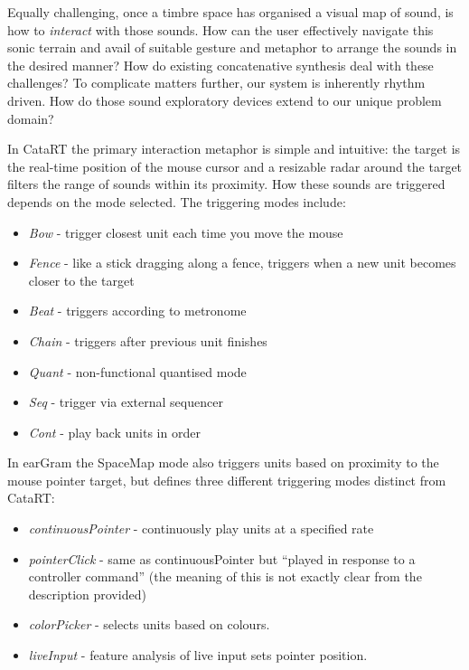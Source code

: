 Equally challenging, once a timbre space has organised a visual map of sound, is how to \textit{interact} with those sounds. How can the user effectively navigate this sonic terrain and avail of suitable gesture and metaphor to arrange the sounds in the desired manner? How do existing concatenative synthesis deal with these challenges? To complicate matters further, our system is inherently rhythm driven. How do those sound exploratory devices extend to our unique problem domain?

In CataRT the primary interaction metaphor is simple and intuitive: the target is the real-time position of the mouse cursor and a resizable radar around the target filters the range of sounds within its proximity. How these sounds are triggered depends on the mode selected. The triggering modes include:

\begin{itemize}
  \item \textit{Bow} - trigger closest unit each time you move the mouse
  \item \textit{Fence} - like a stick dragging along a fence, triggers when a new unit becomes closer to the target
  \item \textit{Beat} - triggers according to metronome
  \item \textit{Chain} - triggers after previous unit finishes
  \item \textit{Quant} - non-functional quantised mode
  \item \textit{Seq} - trigger via external sequencer
  \item \textit{Cont} - play back units in order
\end{itemize}

In earGram the SpaceMap mode also triggers units based on proximity to the mouse pointer target, but defines three different triggering modes distinct from CataRT:

 \begin{itemize}
  \item \textit{continuousPointer} - continuously play units at a specified rate
  \item \textit{pointerClick} - same as continuousPointer but ``played in response to a controller command'' (the meaning of this is not exactly clear from the description provided)
  \item \textit{colorPicker} - selects units based on colours. 
  \item \textit{liveInput} - feature analysis of live input sets pointer position.
\end{itemize} 

